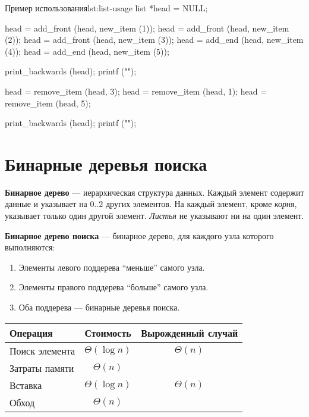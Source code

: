 \begin{clst}{Пример использования}{lst:list-usage}
list *head = NULL;

head = add_front (head, new_item (1));
head = add_front (head, new_item (2));
head = add_front (head, new_item (3));
head = add_end (head, new_item (4));
head = add_end (head, new_item (5));

print_backwards (head);
printf ("\n");

head = remove_item (head, 3);
head = remove_item (head, 1);
head = remove_item (head, 5);

print_backwards (head);
printf ("\n");
\end{clst}

\section{Бинарные деревья поиска}
\label{sec:trees}

\textbf{Бинарное дерево} --- иерархическая структура данных. Каждый элемент содержит данные и указывает на $0..2$ других элементов. На каждый элемент, кроме \emph{корня}, указывает только один другой элемент. \emph{Листья} не указывают ни на один элемент.

\textbf{Бинарное дерево поиска} --- бинарное дерево, для каждого узла которого выполняются:
\begin{enumerate}
  \item Элементы левого поддерева ``меньше'' самого узла.
  \item Элементы правого поддерева ``больше'' самого узла.
  \item Оба поддерева --- бинарные деревья поиска.
\end{enumerate}

\begin{center}
  \begin{tabular}{lcc}
    \toprule
    Операция & Стоимость & Вырожденный случай \\
    \midrule
    Поиск элемента & $\Theta(\log n)$ & $\Theta(n)$ \\
    Затраты памяти & $\Theta(n)$ & \\
    Вставка & $\Theta(\log n)$ & $\Theta(n)$ \\
    Обход & $\Theta(n)$ & \\
    \bottomrule
  \end{tabular}
\end{center}


